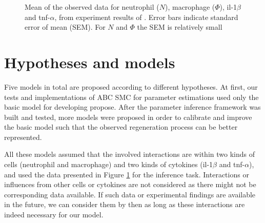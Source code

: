 \begin{figure}
    \begin{center}
    \end{center}

    \caption[Mean of the observed data]%
    {Mean of the observed data for neutrophil ($N$), macrophage ($\Phi$), il-1$\beta$ and tnf-$\alpha$, from experiment results of \cite{ref:Tsarouchas}. Error bars indicate standard error of mean (SEM). For $N$ and $\Phi$ the SEM is relatively small}
    \label{fig:obs_data}

\end{figure}

\section{Hypotheses and models}

Five models in total are proposed according to different hypotheses. At first, our tests and implementations of ABC SMC for parameter estimations used only the basic model for developing propose. After the parameter inference framework was built and tested, more models were proposed in order to calibrate and improve the basic model such that the observed regeneration process can be better represented.

All these models assumed that the involved interactions are within two kinds of cells (neutrophil and macrophage) and two kinds of cytokines (il-1$\beta$ and tnf-$\alpha$), and used the data presented in Figure \ref{fig:obs_data} for the inference task. Interactions or influences from other cells or cytokines are not considered as there might not be corresponding data available. If such data or experimental findings are available in the future, we can consider them by then as long as these interactions are indeed necessary for our model.

